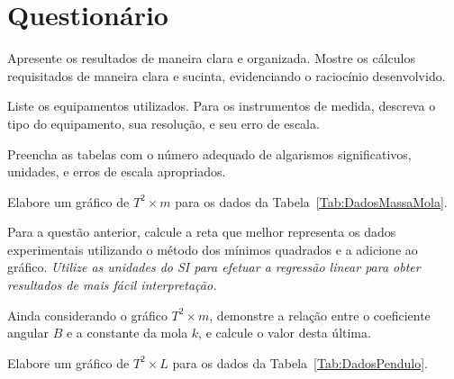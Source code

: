 \vspace{5mm}

\section{Questionário}

\begin{question}[type={exam}]{1}
Apresente os resultados de maneira clara e organizada. Mostre os cálculos requisitados de maneira clara e sucinta, evidenciando o raciocínio desenvolvido.
\end{question}

\begin{question}[type={exam}]{0.75}
Liste os equipamentos utilizados. Para os instrumentos de medida, descreva o tipo do equipamento, sua resolução, e seu erro de escala.
\end{question}

\begin{question}[type={exam}]{0.75}
Preencha as tabelas com o número adequado de algarismos significativos, unidades, e erros de escala apropriados. 
\end{question}

\begin{question}[type={exam}]{1}
Elabore um gráfico de $T^2 \times m$ para os dados da Tabela~\ref{Tab:DadosMassaMola}.
\end{question}

\begin{question}[type={exam}]{1}
Para a questão anterior, calcule a reta que melhor representa os dados experimentais utilizando o método dos mínimos quadrados e a adicione ao gráfico.  \emph{Utilize as unidades do SI para efetuar a regressão linear para obter resultados de mais fácil interpretação.}
\end{question}
 
 \begin{question}[type={exam}]{1}
Ainda considerando o gráfico $T^2\times m$, demonstre a relação entre o coeficiente angular $B$ e a constante da mola $k$, e calcule o valor desta última.
\end{question}

\begin{question}[type={exam}]{1}
Elabore um gráfico de $T^2 \times L$ para os dados da Tabela~\ref{Tab:DadosPendulo}.
\end{question}

